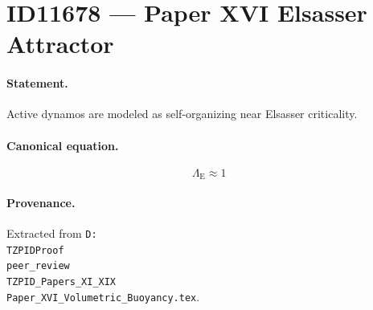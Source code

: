 \section*{ID11678 --- Paper XVI Elsasser Attractor}

\paragraph{Statement.}
Active dynamos are modeled as self-organizing near Elsasser criticality.

\paragraph{Canonical equation.}
\[
\Lambda_{\mathrm{E}}\approx1
\]

\paragraph{Provenance.}
Extracted from \texttt{D:\\TZPIDProof\\peer\_review\\TZPID\_Papers\_XI\_XIX\\Paper\_XVI\_Volumetric\_Buoyancy.tex}.
